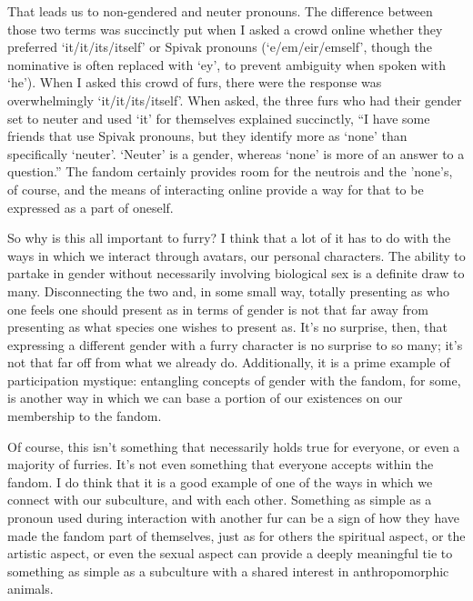 That leads us to non-gendered and neuter pronouns. The difference between those two terms was succinctly put when I asked a crowd online whether they preferred `it/it/its/itself' or Spivak pronouns (`e/em/eir/emself', though the nominative is often replaced with `ey', to prevent ambiguity when spoken with `he'). When I asked this crowd of furs, there were the response was overwhelmingly `it/it/its/itself'. When asked, the three furs who had their gender set to neuter and used `it' for themselves explained succinctly, ``I have some friends that use Spivak pronouns, but they identify more as `none' than specifically `neuter'. `Neuter' is a gender, whereas `none' is more of an answer to a question.'' The fandom certainly provides room for the neutrois and the 'none's, of course, and the means of interacting online provide a way for that to be expressed as a part of oneself.

So why is this all important to furry? I think that a lot of it has to do with the ways in which we interact through avatars, our personal characters.  The ability to partake in gender without necessarily involving biological sex is a definite draw to many. Disconnecting the two and, in some small way, totally presenting as who one feels one should present as in terms of gender is not that far away from presenting as what species one wishes to present as. It's no surprise, then, that expressing a different gender with a furry character is no surprise to so many; it's not that far off from what we already do. Additionally, it is a prime example of participation mystique: entangling concepts of gender with the fandom, for some, is another way in which we can base a portion of our existences on our membership to the fandom.

Of course, this isn't something that necessarily holds true for everyone, or even a majority of furries. It's not even something that everyone accepts within the fandom. I do think that it is a good example of one of the ways in which we connect with our subculture, and with each other. Something as simple as a pronoun used during interaction with another fur can be a sign of how they have made the fandom part of themselves, just as for others the spiritual aspect, or the artistic aspect, or even the sexual aspect can provide a deeply meaningful tie to something as simple as a subculture with a shared interest in anthropomorphic animals.

